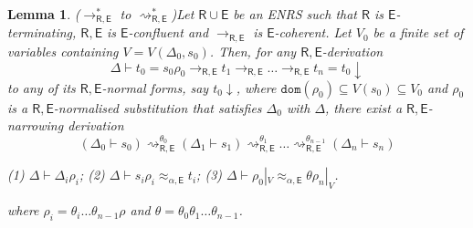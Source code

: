 \documentclass[11pt,a4paper]{amsart}
\newcommand{\ealeq}{\approx_{\alpha,\theory{E}}}
\newcommand{\alert}[1]{\textcolor{red}{#1}}
\newcommand{\theory}[1]{\ensuremath{\mathsf{#1}}}
\theoremstyle{plain}
\newtheorem{lemma}[theorem]{Lemma}
\theoremstyle{definition}
\theoremstyle{remark}
\begin{document}
\begin{lemma}{($\to^*_{\theory{R,E}}$ to $\rightsquigarrow^*_{\theory{R,E}}$)}\label{theo:rewritenarr}
Let $\theory{R}{\cup}\theory{E}$ be an ENRS such that $\theory{R}$ is 
\theory{E}-terminating, \theory{R,E} is \theory{E}-confluent
and $\to_{\theory{R,E}}$ is $\theory{E}$-coherent. Let $V_0$ be a finite set of variables containing $V=V(\Delta_0,s_0)$. Then, for any $\theory{R,E}$-derivation 
$$\Delta \vdash t_0 = s_0\rho_0\rightarrow_{\theory{R,E}} t_1\rightarrow_{\theory{R,E}}\ldots \rightarrow_{\theory{R,E}} t_n=t_0{\downarrow}$$
to any of its $\theory{R,E}$-normal forms, say $t_0{\downarrow}$, where $\texttt{dom}(\rho_0) \subseteq V(s_0) \subseteq V_0$ and $\rho_0$ is a $\theory{R,E}$-normalised substitution that satisfies $\Delta_0$ with $\Delta$, there exist a $\theory{R,E}$-narrowing derivation 
$$(\Delta_0\vdash s_0) \rightsquigarrow^{\theta_0}_{\theory{R,E}} (\Delta_1 \vdash s_1) \rightsquigarrow^{\theta_1}_{\theory{R,E}}  \ldots \rightsquigarrow^{\theta_{n-1}}_{\theory{R,E}} (\Delta_n \vdash s_n) $$
\begin{center}
(1) $\Delta\vdash \Delta_i\rho_i$; \qquad 
(2)  $\Delta \vdash s_i\rho_i \ealeq t_i$;\qquad 
(3)  $\Delta \vdash \rho_0|_V \ealeq \theta\rho_n|_V$.
\end{center}
where  $\rho_{i}=\theta_i\ldots \theta_{n-1}\rho$ and  $\theta=\theta_0\theta_1\ldots \theta_{n-1}$.
\end{lemma}
\end{document}
